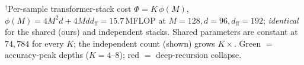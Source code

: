 \begin{table}[p]
{\begin{tabular}{rrrccccccccccccccc}
\bottomrule
\end{tabular}}
\par\noindent\footnotesize $^\dagger$Per-sample transformer-stack cost $\Phi=K\,\phi(M)$, $\phi(M){=}4M^2d+4Mdd_{\mathrm{ff}}=15.7$\,MFLOP at $M{=}128,d{=}96,d_{\mathrm{ff}}{=}192$; \emph{identical} for the shared (ours) and independent stacks. Shared parameters are constant at $74{,}784$ for every $K$; the independent count (shown) grows $K\times$. \colorbox{natgood}{Green} $=$ accuracy-peak depths ($K{=}4\text{--}8$); \colorbox{natbad}{red} $=$ deep-recursion collapse.
\end{table}
